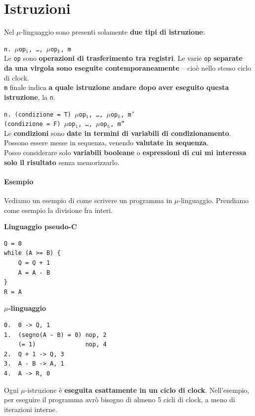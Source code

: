\documentclass[10pt]{report}
\begin{document}
\section{Istruzioni}
Nel $\mu$-linguaggio sono presenti solamente \textbf{due tipi di istruzione}:
\begin{list}{}{}
	\item \texttt{n. $\mu$op$_1$, \ldots, $\mu$op$_k$, m}\\
	Le \texttt{op} sono \textbf{operazioni di trasferimento tra registri}. Le varie \texttt{op} \textbf{separate da una virgola sono eseguite contemporaneamente} -- cioè nello stesso ciclo di clock.\\
	\texttt{m} finale indica \textbf{a quale istruzione andare dopo aver eseguito questa istruzione}, la \texttt{n}.
	\item \texttt{n. (condizione = T) $\mu$op$_1$, \ldots, $\mu$op$_k$, m'\\
	(condizione = F) $\mu$op$_1$, \ldots, $\mu$op$_h$, m''}\\
	Le \textbf{condizioni} sono \textbf{date in termini di variabili di condizionamento}. Possono essere messe in sequenza, venendo \textbf{valutate in sequenza}.\\
	Posso considerare solo \textbf{variabili booleane} o \textbf{espressioni di cui mi interessa solo il risultato} senza memorizzarlo.
\end{list}
\paragraph{Esempio} Vediamo un esempio di come scrivere un programma in $\mu$-linguaggio. Prendiamo come esempio la divisione fra interi.\\
\begin{multicols}{2}
\begin{center}
\textbf{Linguaggio pseudo-C}
\begin{verbatim}
Q = 0
while (A >= B) {
    Q = Q + 1
    A = A - B
}
R = A
\end{verbatim}
\end{center}
\columnbreak
\begin{center}
\textbf{$\mu$-linguaggio}
\begin{lstlisting}
0.  0 -> Q, 1
1.  (segno(A - B) = 0) nop, 2
    (= 1)              nop, 4
2.  Q + 1 -> Q, 3
3.  A - B -> A, 1
4.  A -> R, 0
\end{lstlisting}
\end{center}
\end{multicols}
Ogni $\mu$-istruzione è \textbf{eseguita esattamente in un ciclo di clock}. Nell'esempio, per eseguire il programma avrò bisogno di almeno 5 cicli di clock, a meno di iterazioni interne.
\pagebreak
\end{document}
